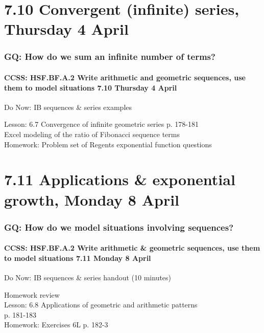 \documentclass{beamer}
\begin{document}
  \section{7.10 Convergent (infinite) series, Thursday 4 April}
    \frame
    {
      \frametitle{GQ: How do we sum an infinite number of terms?}
      \framesubtitle{CCSS: HSF.BF.A.2 Write arithmetic and geometric sequences, use them to model situations \hfill \alert{7.10 Thursday 4 April}}

      \begin{block}{Do Now: IB sequences \& series examples}
      \end{block}
      Lesson: 6.7 Convergence of infinite geometric series p. 178-181\\
      Excel modeling of the ratio of Fibonacci sequence terms\\[1cm]
      Homework: Problem set of Regents exponential function questions
    }

  \section{7.11 Applications \& exponential growth, Monday 8 April}
    \frame
    {
      \frametitle{GQ: How do we model situations involving sequences?}
      \framesubtitle{CCSS: HSF.BF.A.2 Write arithmetic \& geometric sequences, use them to model situations \hfill \alert{7.11 Monday 8 April}}

      \begin{block}{Do Now: IB sequences \& series handout (10 minutes)}
      \end{block}
      Homework review\\
      Lesson: 6.8 Applications of geometric and arithmetic patterns \\p. 181-183\\[1cm]
      Homework: Exercises 6L p.  182-3
    }
\end{document}
